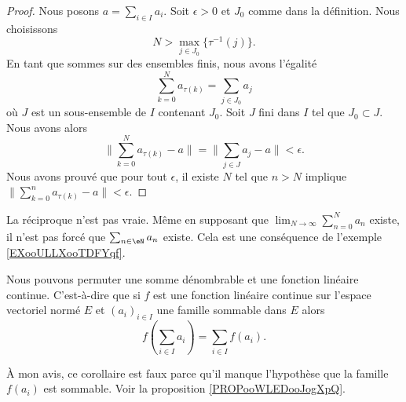 \begin{proof}
    Nous posons \( a=\sum_{i\in I}a_i\). Soit \( \epsilon>0\) et \( J_0\) comme dans la définition. Nous choisissons
    \begin{equation}
        N>\max_{j\in J_0}\{ \tau^{-1}(j) \}.
    \end{equation}
    En tant que sommes sur des ensembles finis, nous avons l'égalité
    \begin{equation}
        \sum_{k=0}^Na_{\tau(k)}=\sum_{j\in J_0}a_j
    \end{equation}
    où \( J\) est un sous-ensemble de \( I\) contenant \( J_0\). Soit \( J\) fini dans \( I\) tel que \( J_0\subset J\). Nous avons alors
    \begin{equation}
        \| \sum_{k=0}^Na_{\tau(k)}-a \|=\| \sum_{j\in J}a_j-a \|<\epsilon.
    \end{equation}
    Nous avons prouvé que pour tout \( \epsilon\), il existe \( N\) tel que \( n>N\) implique \( \| \sum_{k=0}^na_{\tau(k)}-a\| <\epsilon\).
\end{proof}

La réciproque n'est pas vraie. Même en supposant que \( \lim_{N\to \infty} \sum_{n=0}^Na_n\) existe, il n'est pas forcé que \( \sum_{n\in\eN}a_n\) existe. Cela est une conséquence de l'exemple \ref{EXooULLXooTDFYqf}.

\begin{corollary}       \label{CORooBPILooWDXpUM}       %
    Nous pouvons permuter une somme dénombrable et une fonction linéaire continue. C'est-à-dire que si \( f\) est une fonction linéaire continue sur l'espace vectoriel normé \( E\) et \( (a_i)_{i\in I}\) une famille sommable dans \( E\) alors
    \begin{equation}
        f\left( \sum_{i\in I}a_i \right)=\sum_{i\in I}f(a_i).
    \end{equation}
\end{corollary}

\begin{probleme}
    À mon avis, ce corollaire est faux parce qu'il manque l'hypothèse que la famille \( f(a_i)\) est sommable. Voir la proposition \ref{PROPooWLEDooJogXpQ}.
\end{probleme}


